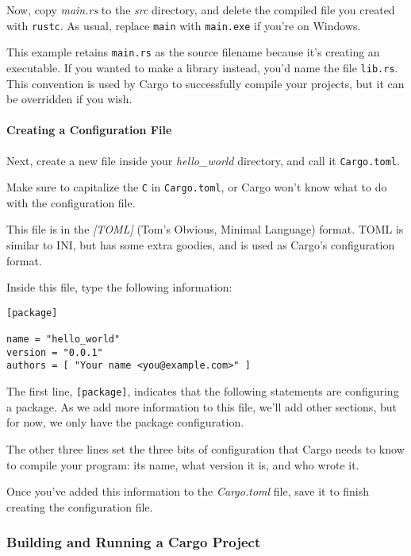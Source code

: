 \documentclass[a4paper,]{book}
\let\oldparagraph\paragraph
\renewcommand{\paragraph}[1]{\oldparagraph{#1}\mbox{}}
\begin{document}
Now, copy \emph{main.rs} to the \emph{src} directory, and delete the
compiled file you created with \texttt{rustc}. As usual, replace
\texttt{main} with \texttt{main.exe} if you're on Windows.

This example retains \texttt{main.rs} as the source filename because
it's creating an executable. If you wanted to make a library instead,
you'd name the file \texttt{lib.rs}. This convention is used by Cargo to
successfully compile your projects, but it can be overridden if you
wish.

\paragraph{Creating a Configuration
File}\label{creating-a-configuration-file}

Next, create a new file inside your \emph{hello\_world} directory, and
call it \texttt{Cargo.toml}.

Make sure to capitalize the \texttt{C} in \texttt{Cargo.toml}, or Cargo
won't know what to do with the configuration file.

This file is in the \emph{{[}TOML{]}} (Tom's Obvious, Minimal Language)
format. TOML is similar to INI, but has some extra goodies, and is used
as Cargo's configuration format.

Inside this file, type the following information:

\begin{verbatim}
[package]

name = "hello_world"
version = "0.0.1"
authors = [ "Your name <you@example.com>" ]
\end{verbatim}

The first line, \texttt{{[}package{]}}, indicates that the following
statements are configuring a package. As we add more information to this
file, we'll add other sections, but for now, we only have the package
configuration.

The other three lines set the three bits of configuration that Cargo
needs to know to compile your program: its name, what version it is, and
who wrote it.

Once you've added this information to the \emph{Cargo.toml} file, save
it to finish creating the configuration file.

\subsubsection{Building and Running a Cargo
Project}\label{building-and-running-a-cargo-project}
\end{document}
